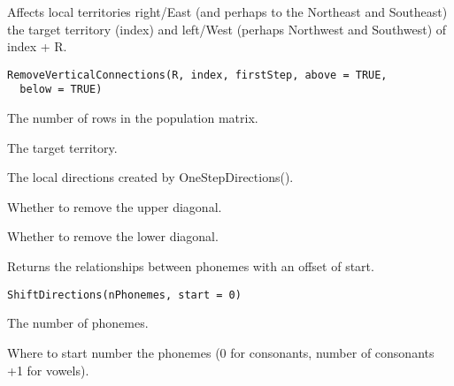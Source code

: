 \documentclass[a4paper]{book}
\begin{document}
%
\begin{Description}\relax
Affects local territories right/East (and perhaps to the Northeast and Southeast) the target territory (index) and left/West (perhaps Northwest and Southwest) of index + R.
\end{Description}
%
\begin{Usage}
\begin{verbatim}
RemoveVerticalConnections(R, index, firstStep, above = TRUE,
  below = TRUE)
\end{verbatim}
\end{Usage}
%
\begin{Arguments}
\begin{ldescription}
\item[\code{R}] The number of rows in the population matrix.

\item[\code{index}] The target territory.

\item[\code{firstStep}] The local directions created by OneStepDirections().

\item[\code{above}] Whether to remove the upper diagonal.

\item[\code{below}] Whether to remove the lower diagonal.
\end{ldescription}
\end{Arguments}
%
\begin{Description}\relax
Returns the relationships between phonemes with an offset of start.
\end{Description}
%
\begin{Usage}
\begin{verbatim}
ShiftDirections(nPhonemes, start = 0)
\end{verbatim}
\end{Usage}
%
\begin{Arguments}
\begin{ldescription}
\item[\code{nPhonemes}] The number of phonemes.

\item[\code{start}] Where to start number the phonemes (0 for consonants, number of consonants +1 for vowels).
\end{ldescription}
\end{Arguments}
\end{document}
